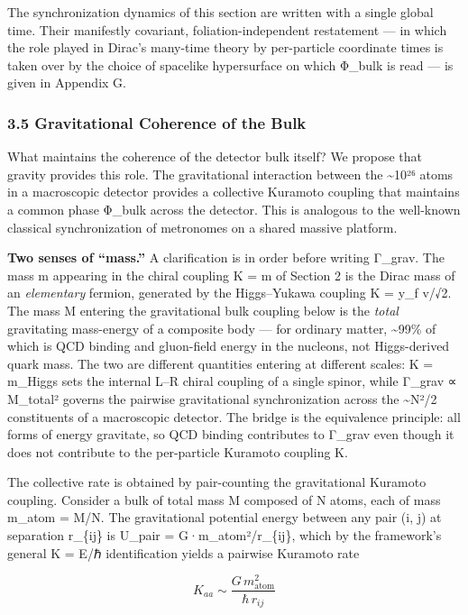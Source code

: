 \documentclass[
]{article}
\begin{document}
The synchronization dynamics of this section are written with a single
global time. Their manifestly covariant, foliation-independent
restatement --- in which the role played in Dirac's many-time theory by
per-particle coordinate times is taken over by the choice of spacelike
hypersurface on which Φ\_bulk is read --- is given in Appendix G.

\subsubsection{3.5 Gravitational Coherence of the
Bulk}\label{gravitational-coherence-of-the-bulk}

What maintains the coherence of the detector bulk itself? We propose
that gravity provides this role. The gravitational interaction between
the \textasciitilde10²⁶ atoms in a macroscopic detector provides a
collective Kuramoto coupling that maintains a common phase Φ\_bulk
across the detector. This is analogous to the well-known classical
synchronization of metronomes on a shared massive platform.

\textbf{Two senses of ``mass.''} A clarification is in order before
writing Γ\_grav. The mass m appearing in the chiral coupling K = m of
Section 2 is the Dirac mass of an \emph{elementary} fermion, generated
by the Higgs--Yukawa coupling K = y\_f v/√2. The mass M entering the
gravitational bulk coupling below is the \emph{total} gravitating
mass-energy of a composite body --- for ordinary matter,
\textasciitilde99\% of which is QCD binding and gluon-field energy in
the nucleons, not Higgs-derived quark mass. The two are different
quantities entering at different scales: K = m\_Higgs sets the internal
L--R chiral coupling of a single spinor, while Γ\_grav ∝ M\_total²
governs the pairwise gravitational synchronization across the
\textasciitilde N²/2 constituents of a macroscopic detector. The bridge
is the equivalence principle: all forms of energy gravitate, so QCD
binding contributes to Γ\_grav even though it does not contribute to the
per-particle Kuramoto coupling K.

The collective rate is obtained by pair-counting the gravitational
Kuramoto coupling. Consider a bulk of total mass M composed of N atoms,
each of mass m\_atom = M/N. The gravitational potential energy between
any pair (i, j) at separation r\_\{ij\} is U\_pair =
G·m\_atom²/r\_\{ij\}, which by the framework's general K = E/ℏ
identification yields a pairwise Kuramoto rate

\[K_{aa} \sim \frac{G\, m_{\text{atom}}^2}{\hbar\, r_{ij}}\]
\end{document}
